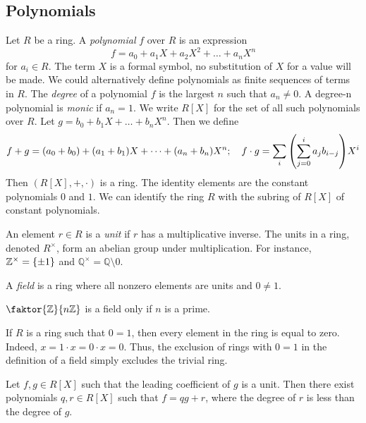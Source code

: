 \subsection{Polynomials}
\begin{definition}
	Let \( R \) be a ring.
	A \textit{polynomial} \( f \) over \( R \) is an expression
	\[
		f = a_0 + a_1 X + a_2 X^2 + \dots + a_n X^n
	\]
	for \( a_i \in R \).
	The term \( X \) is a formal symbol, no substitution of \( X \) for a value will be made.
	We could alternatively define polynomials as finite sequences of terms in \( R \).
	The \textit{degree} of a polynomial \( f \) is the largest \( n \) such that \( a_n \neq 0 \).
	A degree-n polynomial is \textit{monic} if \( a_n = 1 \).
	We write \( R[X] \) for the set of all such polynomials over \( R \).
	Let \( g = b_0 + b_1 X + \dots + b_n X^n \).
	Then we define
	\[
		f + g = (a_0 + b_0) + (a_1 + b_1) X + \dots + (a_n + b_n) X^n;\quad f \cdot g = \sum_i \qty(\sum_{j=0}^i a_j b_{i-j}) X^i
	\]
	Then \( (R[X], +, \cdot) \) is a ring.
	The identity elements are the constant polynomials \( 0 \) and \( 1 \).
	We can identify the ring \( R \) with the subring of \( R[X] \) of constant polynomials.
\end{definition}
\begin{definition}
	An element \( r \in R \) is a \textit{unit} if \( r \) has a multiplicative inverse.
	The units in a ring, denoted \( R^\times \), form an abelian group under multiplication.
	For instance, \( \mathbb Z^\times = \qty{\pm 1} \) and \( \mathbb Q^\times = \mathbb Q \setminus \qty{0} \).
\end{definition}
\begin{definition}
	A \textit{field} is a ring where all nonzero elements are units and \( 0 \neq 1 \).
\end{definition}
\begin{example}
	\( \faktor{\mathbb Z}{n\mathbb Z} \) is a field only if \( n \) is a prime.
\end{example}
\begin{remark}
	If \( R \) is a ring such that \( 0 = 1 \), then every element in the ring is equal to zero.
	Indeed, \( x = 1\cdot x = 0\cdot x = 0 \).
	Thus, the exclusion of rings with \( 0 = 1 \) in the definition of a field simply excludes the trivial ring.
\end{remark}
\begin{proposition}
	Let \( f, g \in R[X] \) such that the leading coefficient of \( g \) is a unit.
	Then there exist polynomials \( q, r \in R[X] \) such that \( f = qg + r \), where the degree of \( r \) is less than the degree of \( g \).
\end{proposition}
